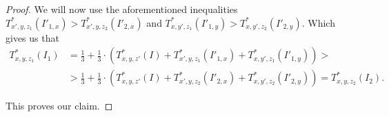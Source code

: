 \begin{proof}
  We will now use the aforementioned inequalities $T^*_{x',y,z_1}(I'_{1,x}) > T^*_{x',y,z_2}(I'_{2,x})$ and $T^*_{x,y',z_1}(I'_{1,y}) > T^*_{x,y',z_2}(I'_{2,y})$. Which gives us that
\begin{align*}
    T^*_{x,y,z_1}(I_1) & = 
      \frac{1}{3} + 
      \frac{1}{3}\cdot \left( 
        T_{x,y,z'}^*(I) + 
        T^*_{x',y,z_1}(I'_{1,x}) +
        T^*_{x,y',z_1}(I'_{1,y}) 
      \right)
      > 
      \\
      & >
      \frac{1}{3} + 
      \frac{1}{3}\cdot \left( 
        T_{x,y,z'}^*(I) + 
        T^*_{x',y,z_2}(I'_{2,x}) +
        T^*_{x,y',z_2}(I'_{2,y}) 
      \right) 
      = T^*_{x,y,z_2}(I_2).
  \end{align*}

  This proves our claim.    
\end{proof}

